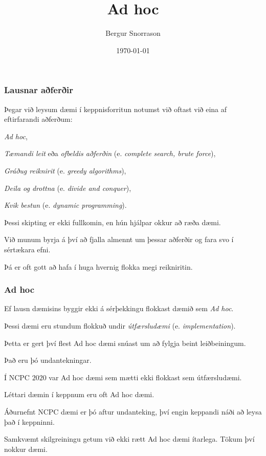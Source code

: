 \title{Ad hoc}
\author{Bergur Snorrason}
\date{\today}



\frame{\titlepage}

{
	\frametitle{Lausnar aðferðir}
	{
		\item<1-> Þegar við leysum dæmi í keppnisforritun notumst við oftast við eina af eftirfarandi aðferðum:
		{
			\item<2-> \emph{Ad hoc},
			\item<3-> \emph{Tæmandi leit} eða \emph{ofbeldis aðferðin} (e. \emph{complete search, brute force}),
			\item<4-> \emph{Gráðug reiknirit} (e. \emph{greedy algorithms}),
			\item<5-> \emph{Deila og drottna} (e. \emph{divide and conquer}),
			\item<6-> \emph{Kvik bestun} (e. \emph{dynamic programming}).
		}
		\item<7-> Þessi skipting er ekki fullkomin, en hún hjálpar okkur að ræða dæmi.
		\item<8-> Við munum byrja á því að fjalla almennt um þessar aðferðir og fara svo í sértækara efni.
		\item<9-> Þá er oft gott að hafa í huga hvernig flokka megi reikniritin.
	}
}

{
	\frametitle{Ad hoc}
	{
		\item<1-> Ef lausn dæmisins byggir ekki á sérþekkingu flokkast dæmið sem \emph{Ad hoc}.
		\item<2-> Þessi dæmi eru stundum flokkuð undir \emph{útfærsludæmi} (e. \emph{implementation}).
		\item<3-> Þetta er gert því flest Ad hoc dæmi snúast um að fylgja beint leiðbeiningum.
		\item<4-> Það eru þó undantekningar.
		\item<5-> Í NCPC $2020$ var Ad hoc dæmi sem mætti ekki flokkast sem útfærsludæmi.
		\item<6-> Léttari dæmin í keppnum eru oft Ad hoc dæmi.
		\item<7-> Áðurnefnt NCPC dæmi er þó aftur undanteking, því engin keppandi náði að leysa það í keppninni.
		\item<8-> Samkvæmt skilgreiningu getum við ekki rætt Ad hoc dæmi ítarlega. Tökum því nokkur dæmi.
	}
}

